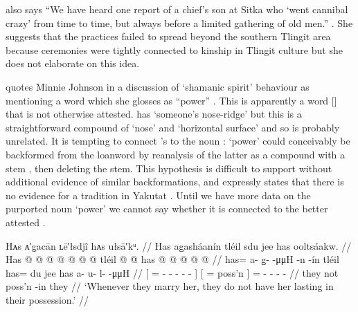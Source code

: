 \citeauthor{mcclellan:1954} also says “We have heard one report of a chief’s son at Sitka who ‘went cannibal crazy’ from time to time, but always before a limited gathering of old men.” \parencite[96]{mcclellan:1954}.
She suggests that the  practices failed to spread beyond the southern Tlingit area because ceremonies were tightly connected to kinship in Tlingit culture \parencites[96]{mcclellan:1954}[567]{mcclellan:1975b} but she does not elaborate on this idea.

\citeauthor{de-laguna:1972} quotes  Minnie Johnson in a discussion of  ‘shamanic spirit’ behaviour as mentioning a word  which she glosses as “power” \parencite[704 col.\ 1 para.\ 2]{de-laguna:1972}.
This is apparently a word  [] that is not otherwise attested.
\citeauthor{leer:1973} has  ‘someone’s nose-ridge’ \parencite[f06/5]{leer:1973} but this is a straightforward compound of  ‘nose’ and  ‘horizontal surface’ and so is probably unrelated.
It is tempting to connect \citeauthor{de-laguna:1972}’s  to the noun :  ‘power’ could conceivably be backformed from the loanword  by reanalysis of the latter as a compound  with a stem , then deleting the stem.
This hypothesis is difficult to support without additional evidence of similar backformations, and \citeauthor{de-laguna:1972} expressly states that there is no evidence for a  tradition in Yakutat \parencite[628]{de-laguna:1972}.
Until we have more data on the purported noun  ‘power’ we cannot say whether it is connected to the better attested .

\ex\label{ex:89-53-marry-not-last-long}%
%
\begingl
	\glpreamble	Hᴀs ᴀ′g̣acān ʟē′łsdjî hᴀs ułsā′kᵘ. //
	\glpreamble	Has ag̱asháanín tléil sdu jee has ooltsáakw. //
	\gla	{} Has @  @ {} @ {} @ {} @ {} @ {} @ {} {}
		tléil {}  @ {}  @ {} {}
		has @  @ {} @ {} @ {} @ {} //
	\glb	{} has= a- {} g̱-  -μμH -n -ín {}
		tléil {} has= du jee {} {}
		has a- u- l-  -μμH //
	\glc	{}[ = - \· -  - - - {}]
		 {}[ =  poss’n \· {}]
		= - - -  - //
	\gld	{} they  {} {} {} {} {} {} {}
		not {}  {} poss’n -in {}
		they  {} {} {} {}  //
	\glft	‘Whenever they marry her, they do not have her lasting in their possession.’
		//
\endgl
\xe


